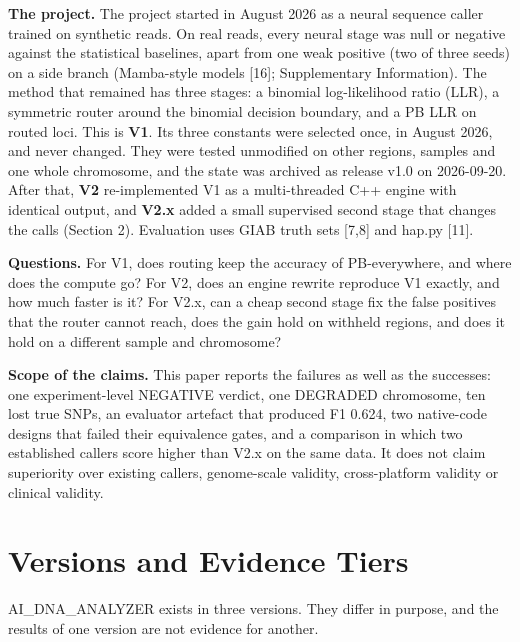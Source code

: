 \documentclass[11pt,a4paper]{article}
\makeatletter
\newcommand{\needspace}[1]{\par\ifdim\pagegoal=\maxdimen\else\dimen@=\pagegoal\advance\dimen@-\pagetotal\ifdim\dimen@<#1\relax\newpage\fi\fi}
\makeatother
\begin{document}
\textbf{The project.} The project started in August 2026 as a neural sequence caller trained on synthetic reads. On real reads, every neural stage was null or negative against the statistical baselines, apart from one weak positive (two of three seeds) on a side branch (Mamba-style models [16]; Supplementary Information). The method that remained has three stages: a binomial log-likelihood ratio (LLR), a symmetric router around the binomial decision boundary, and a PB LLR on routed loci. This is \textbf{V1}. Its three constants were selected once, in August 2026, and never changed. They were tested unmodified on other regions, samples and one whole chromosome, and the state was archived as release v1.0 on 2026-09-20. After that, \textbf{V2} re-implemented V1 as a multi-threaded C++ engine with identical output, and \textbf{V2.x} added a small supervised second stage that changes the calls (Section 2). Evaluation uses GIAB truth sets [7,8] and hap.py [11].

\textbf{Questions.} For V1, does routing keep the accuracy of PB-everywhere, and where does the compute go? For V2, does an engine rewrite reproduce V1 exactly, and how much faster is it? For V2.x, can a cheap second stage fix the false positives that the router cannot reach, does the gain hold on withheld regions, and does it hold on a different sample and chromosome?

\textbf{Scope of the claims.} This paper reports the failures as well as the successes: one experiment-level NEGATIVE verdict, one DEGRADED chromosome, ten lost true SNPs, an evaluator artefact that produced F1 0.624, two native-code designs that failed their equivalence gates, and a comparison in which two established callers score higher than V2.x on the same data. It does not claim superiority over existing callers, genome-scale validity, cross-platform validity or clinical validity.

\FloatBarrier
\needspace{10\baselineskip}
\section{\texorpdfstring{Versions and Evidence Tiers}{Versions and Evidence Tiers}}
AI\_DNA\_ANALYZER exists in three versions. They differ in purpose, and the results of one version are not evidence for another.
\end{document}
